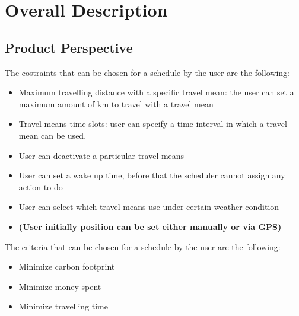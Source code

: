 \chapter{Overall Description}

\section{Product Perspective}
The costraints that can be chosen for a schedule by the user are the following:
\begin{itemize}
\item Maximum travelling distance with a specific travel mean: the user can set a maximum amount of km to travel with a travel mean
\item Travel means time slots: user can specify a time interval in which a travel mean can be used.
\item User can deactivate a particular travel means
\item User can set a wake up time, before that the scheduler cannot assign any action to do
\item User can select which travel means use under certain weather condition
\item \textbf{(User initially position can be set either manually or via GPS)}
\end{itemize}

The criteria that can be chosen for a schedule by the user are the following:

\begin{itemize}
\item Minimize carbon footprint
\item Minimize money spent
\item Minimize travelling time
\end{itemize}